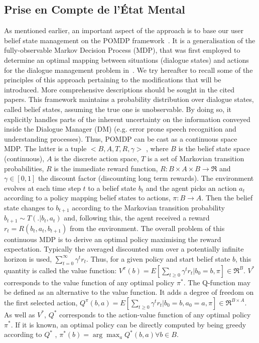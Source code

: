 \documentclass[a4paper,11pt,twoside]{StyleThese}
\begin{document}
\subsection{Prise en Compte de l'État Mental}
As mentioned earlier, an important aspect of the approach is to base our user belief state management on the POMDP framework~\cite{Kaelbling98}. It is a generalisation of the fully-observable Markov Decision Process (MDP), that was first employed to determine an optimal mapping between situations (dialogue states) and actions for the dialogue management problem in~\cite{Levin97}. We try hereafter to recall some of the principles of this approach pertaining to the modifications that will be introduced. More comprehensive descriptions should be sought in the cited papers.
This framework maintains a probability distribution over dialogue states, called belief states, assuming the true one is unobservable. By doing so, it explicitly handles parts of the inherent uncertainty on the information conveyed inside the Dialogue Manager (DM) (e.g. error prone speech recognition and understanding processes).
Thus, POMDP can be cast as a continuous space MDP. The latter is a tuple $<B,A,T,R, \gamma>$ 
, where $B$ is the  belief state space (continuous), $A$ is the discrete action space, $T$ is a set of Markovian transition probabilities, $R$ is the immediate
reward function, $R: B \times A \times B \rightarrow \Re $ and
$\gamma \in [0,1]$ the discount factor (discounting long term
rewards).
The environment evolves at each time step $t$ to a belief state $b_t$ and
the agent picks an action $a_t$ according to a policy mapping belief states to actions, $\pi: B \rightarrow A$. Then the belief state changes to $b_{t+1}$ according to the Markovian transition
probability $b_{t+1} \sim T(.|b_t, a_t) $ and, following this, the agent received a reward $r_t =
R(b_t, a_t, b_{t+1})$ from the environment.
The overall problem of this continuous MDP is to derive an optimal policy maximising the reward expectation. Typically the averaged discounted sum over a potentially
infinite horizon is used, $ \sum^{\infty}_{t=0} {\gamma^t r_t} $. Thus, for a given policy and start belief state
$b$, this quantity is called the value function: $V^{\pi}(b) =
E[\sum_{t\ge0}\gamma^t r_t| b_0 = b, \pi] \in \Re^B$. $V^{\ast}$ corresponds to the value function of any optimal policy
$\pi^{\ast}$.
The Q-function may be defined as an alternative to the value function. It adds a degree of freedom on the first
selected action, $Q^{\pi}(b,a) = E[\sum_{t\ge0}\gamma^t r_t|b_0 = b, a_0 = a, \pi] \in \Re^{B \times A}$.
As well as $V^{\ast}$, $Q^{\ast}$ corresponds to the
action-value function of any optimal policy $\pi^{\ast}$. If it
is known, an optimal policy can be directly computed by being
greedy according to $Q^{\ast}$ ,
$\pi^{\ast}(b) = \arg\max_a Q^{\ast}(b, a) \forall b \in B$.
\end{document}
